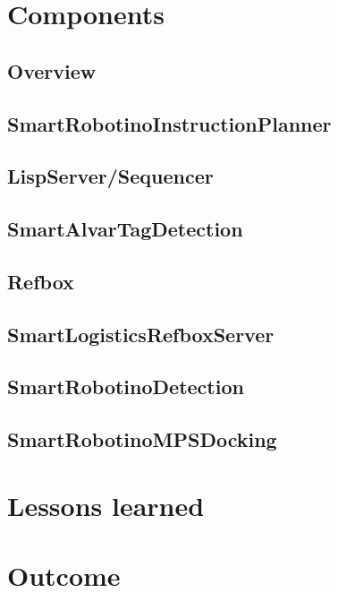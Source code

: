 \documentclass[12pt]{report}
\begin{document}
\chapter{Components}

\section{Overview}
	

\section{SmartRobotinoInstructionPlanner}
	

\section{LispServer/Sequencer}
	

\section{SmartAlvarTagDetection}
	

\section{Refbox}


\section{SmartLogisticsRefboxServer}
	



\section{SmartRobotinoDetection}
	

\section{SmartRobotinoMPSDocking}
	

\chapter{Lessons learned}
    

\chapter{Outcome}
    

\printbibliography
\end{document}
